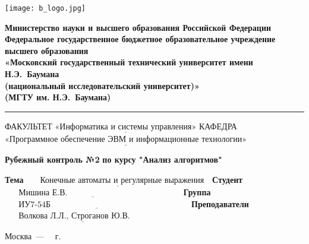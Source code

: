 \documentclass[12pt, a4paper]{report}
\begin{document}
	\begin{titlepage}
		\fontsize{12pt}{12pt}\selectfont
		\noindent \begin{minipage}{0.15\textwidth}
			\texttt{[image: b\_logo.jpg]}
		\end{minipage}
		\noindent\begin{minipage}{0.9\textwidth}\centering
			\textbf{Министерство науки и высшего образования Российской Федерации}\\
			\textbf{Федеральное государственное бюджетное образовательное учреждение высшего образования}\\
			\textbf{«Московский государственный технический университет имени Н.Э.~Баумана}\\
			\textbf{(национальный исследовательский университет)»}\\
			\textbf{(МГТУ им. Н.Э.~Баумана)}
		\end{minipage}
		
		\noindent\rule{18cm}{3pt}
		\newline\newline
		\noindent ФАКУЛЬТЕТ $\underline{\text{«Информатика и системы управления»}}$ \newline\newline
		\noindent КАФЕДРА $\underline{\text{«Программное обеспечение ЭВМ и информационные технологии»}}$\newline\newline\newline\newline\newline\newline\newline
		
		
		\begin{center}
			\Large\textbf{Рубежный контроль №2}\newline
			\Large\textbf{по курсу "Анализ алгоритмов"}\newline
		\end{center}
		
		\noindent\textbf{Тема} $\underline{\text{~~~~~Конечные автоматы и регулярные выражения~~}}$\newline\newline\newline
		\noindent\textbf{Студент} $\underline{\text{~~~~~Мишина Е.В.~~~~~~~~~~~~~~~~~~~~~~~~~~~~~~~~~~~~~~~~~}}$\newline\newline
		\noindent\textbf{Группа} $\underline{\text{~~~~~ИУ7-54Б~~~~~~~~~~~~~~~~~~~~~~~~~~~~~~~~~~~~~~~~~~~~~~~~~~}}$\newline\newline
		\noindent\textbf{Преподаватели} $\underline{\text{~~~~~Волкова Л.Л., Строганов Ю.В.~~~~~~~~~~~}}$\newline
		
		\begin{center}
			\vfill
			Москва~---~\the\year
			~г.
		\end{center}
	\restoregeometry
	\end{titlepage}
	
\end{document}
